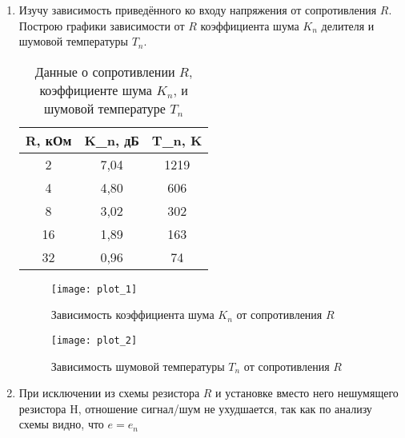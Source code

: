 \begin{enumerate}
	\item Изучу зависимость приведённого ко входу напряжения от сопротивления $ R $. Построю графики зависимости от $ R $ коэффициента шума $ K_n $ делителя и шумовой температуры $ T_n $.
	
	\begin{table}[!h]
		\centering
		\begin{tabular}{|c|c|c|}
			\hline
			R, кОм & K\_n, дБ & T\_n, K \\ \hline
			2      & 7,04     & 1219    \\ \hline
			4      & 4,80      & 606     \\ \hline
			8      & 3,02     & 302     \\ \hline
			16     & 1,89     & 163     \\ \hline
			32     & 0,96     & 74      \\ \hline
		\end{tabular}
		\caption{Данные о сопротивлении $ R $,  коэффициенте шума $ K_n $, и шумовой температуре $ T_n $}
		\label{tab:table_3}
	\end{table}
	\begin{figure}[h!]
		\centering 
		\texttt{[image: plot\_1]}
		\caption{Зависимость коэффициента шума $ K_n $ от сопротивления $ R $}
		\label{fig:plot_1}
	\end{figure}

	\begin{figure}[h!]
		\centering 
		\texttt{[image: plot\_2]}
		\caption{Зависимость шумовой температуры $ T_n $ от сопротивления $ R $}
		\label{fig:plot_2}
	\end{figure}


	
	\item При исключении из схемы резистора $ R $ и установке вместо него нешумящего резистора H, отношение сигнал/шум не ухудшается, так как по анализу схемы видно, что $ e =  e_n $	
	
\end{enumerate}

\newpage
